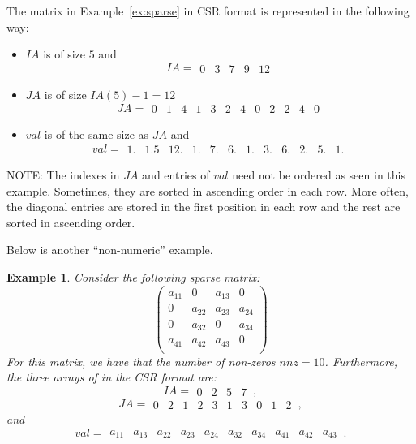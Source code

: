 \documentclass[11pt]{memoir}
\newtheorem{example}[theorem]{Example}
\begin{document}
The matrix in Example~\ref{ex:sparse} in CSR format is represented in the following way:
\begin{itemize}
\item $IA$ is of size $5$ and 
$$IA = 
\begin{array}{||c|c|c|c|c||}0&3&7&9&12\end{array}
$$
\item $JA$ is of size $IA(5)-1=12$  
$$JA = 
\begin{array}{||c|c|c||c|c|c|c||c|c||c|c|c||}
0&1&4&1&3&2&4&0&2&2&4&0
\end{array}
$$
\item $val$ is of the same size as $JA$ and   
$$val = 
\begin{array}{||c|c|c||c|c|c|c||c|c||c|c|c||}
1.&1.5&12.&1.&7.&6.&1.&3.&6.&2.&5.&1.
\end{array}
$$
\end{itemize}

\begin{snugshade}\noindent
NOTE: The indexes in $JA$ and entries of $val$ need not be ordered as seen in this example. Sometimes, they are sorted in ascending order in each row. More often, the diagonal entries are stored in the first position in each row and the rest are sorted in ascending order. 
\end{snugshade}

Below is another ``non-numeric'' example.
%
\begin{example} Consider the following sparse matrix:
$$
\left(
\begin{array}{cccc}
a_{11} & 0 & a_{13} & 0 \\
0 & a_{22} & a_{23} & a_{24} \\
0 & a_{32} & 0 & a_{34} \\
a_{41}& a_{42} & a_{43} & 0 \\
\end{array}
\right)
$$
For this matrix, we have that the number of non-zeros $nnz=10$. Furthermore, the three arrays of in the CSR format are:
$$
IA = 
\begin{array}{||c|c|c|c||}0&2&5&7\end{array}\, ,
$$
$$
JA = 
\begin{array}{||c|c||c|c|c||c|c||c|c|c||}
0&2&1&2&3&1&3&0&1&2\end{array}\, ,
$$
and 
$$
val = 
\begin{array}{||c|c||c|c|c||c|c||c|c|c||}
a_{11} & a_{13} & a_{22} & a_{23} & a_{24} & a_{32} & a_{34} & a_{41} & a_{42} & a_{43}\end{array}\,.
$$
\end{example}
\end{document}
